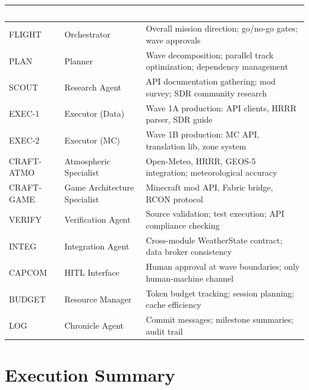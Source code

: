 \documentclass[11pt,letterpaper]{article}
\newcommand{\tableheader}[1]{\textbf{\sffamily\textcolor{white}{#1}}}
\begin{document}
\begin{center}
\begin{tabularx}{\textwidth}{L{2.5cm}L{3cm}X}
\toprule
{}
\tableheader{Role} & \tableheader{Agent} & \tableheader{Responsibility} \\
\midrule
FLIGHT & Orchestrator & Overall mission direction; go/no-go gates; wave approvals \\
PLAN & Planner & Wave decomposition; parallel track optimization; dependency management \\
SCOUT & Research Agent & API documentation gathering; mod survey; SDR community research \\
EXEC-1 & Executor (Data) & Wave 1A production: API clients, HRRR parser, SDR guide \\
EXEC-2 & Executor (MC) & Wave 1B production: MC API, translation lib, zone system \\
CRAFT-ATMO & Atmospheric Specialist & Open-Meteo, HRRR, GEOS-5 integration; meteorological accuracy \\
CRAFT-GAME & Game Architecture Specialist & Minecraft mod API, Fabric bridge, RCON protocol \\
VERIFY & Verification Agent & Source validation; test execution; API compliance checking \\
INTEG & Integration Agent & Cross-module WeatherState contract; data broker consistency \\
CAPCOM & HITL Interface & Human approval at wave boundaries; only human-machine channel \\
BUDGET & Resource Manager & Token budget tracking; session planning; cache efficiency \\
LOG & Chronicle Agent & Commit messages; milestone summaries; audit trail \\
\bottomrule
\end{tabularx}
\end{center}

\section{Execution Summary}
\end{document}
